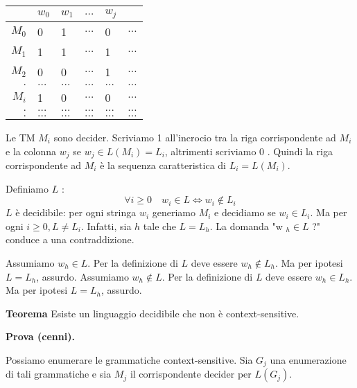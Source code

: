 \vspace{5mm}
\begin{center}
    \begin{tabular}{r|lllll} 
& $w_{0}$ & $w_{1}$ & $\ldots$ & $w_{j}$ & \\
\hline$M_{0}$ & 0 & 1 & $\ldots$ & 0 & $\ldots$ \\
$M_{1}$ & 1 & 1 & $\ldots$ & 1 & $\ldots$ \\
$M_{2}$ & 0 & 0 & $\ldots$ & 1 & $\ldots$ \\
$.$ & $\ldots$ & $\ldots$ & $\ldots$ & $\ldots$ & $\ldots$ \\
$M_{i}$ & 1 & 0 & $\ldots$ & 0 & $\ldots$ \\
$.$ & $\ldots$ & $\ldots$ & $\ldots$ & $\ldots$ & $\ldots$ \\
$.$ & $\ldots$ & $\ldots$ & $\ldots$ & $\ldots$ & $\ldots$
\end{tabular}
\end{center}

\vspace{5mm}

Le TM $M_{i}$ sono decider. Scriviamo 1 all'incrocio tra la riga corrispondente ad $M_{i}$ e la colonna $w_{j}$ se $w_{j} \in L\left(M_{i}\right)=L_{i}$, altrimenti scriviamo 0 . Quindi la riga corrispondente ad $M_{i}$ è la sequenza caratteristica di $L_{i}=L\left(M_{i}\right)$.

\vspace{5mm}

Definiamo $L$ :
$$
\forall i \geq 0 \quad w_{i} \in L \Leftrightarrow w_{i} \notin L_{i}
$$
$L$ è decidibile: per ogni stringa $w_{i}$ generiamo $M_{i}$ e decidiamo se $w_{i} \in L_{i}$. Ma per ogni $i \geq 0, L \neq L_{i}$.
Infatti, sia $h$ tale che $L=L_{h} .$ La domanda "w $_{h} \in L$ ?" conduce a una contraddizione.

Assumiamo $w_{h} \in L$. Per la definizione di $L$ deve essere $w_{h} \notin L_{h} .$ Ma per ipotesi $L=L_{h}$, assurdo.
Assumiamo $w_{h} \notin L$. Per la definizione di $L$ deve essere $w_{h} \in L_{h}$. Ma per ipotesi $L=L_{h}$, assurdo.

\vspace{5mm}

\textbf{Teorema}
Esiste un linguaggio decidibile che non è context-sensitive.

\vspace{5mm}

\textbf{Prova (cenni).}

Possiamo enumerare le grammatiche context-sensitive.
Sia $G_{j}$ una enumerazione di tali grammatiche e sia $M_{j}$ il corrispondente decider per $L\left(G_{j}\right)$.

